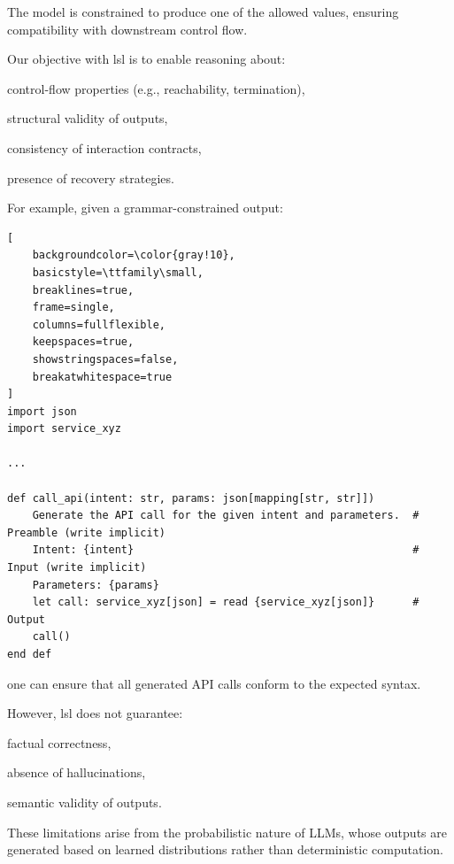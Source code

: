 \documentclass[manuscript,screen]{acmart}
\begin{document}
The model is constrained to produce one of the allowed values, ensuring compatibility with downstream control flow.


Our objective with \ac{lsl} is to enable reasoning about:
\begin{enumerate*}[label=(\roman*)]
    \item control-flow properties (e.g., reachability, termination),
    \item structural validity of outputs,
    \item consistency of interaction contracts,
    \item presence of recovery strategies.
\end{enumerate*}

For example, given a grammar-constrained output:

\begin{lstlisting}[
    backgroundcolor=\color{gray!10},
    basicstyle=\ttfamily\small,
    breaklines=true,
    frame=single,
    columns=fullflexible,
    keepspaces=true,
    showstringspaces=false,
    breakatwhitespace=true
]
import json
import service_xyz

...

def call_api(intent: str, params: json[mapping[str, str]])
    Generate the API call for the given intent and parameters.  # Preamble (write implicit)
    Intent: {intent}                                            # Input (write implicit)
    Parameters: {params}
    let call: service_xyz[json] = read {service_xyz[json]}      # Output
    call()
end def
\end{lstlisting}

one can ensure that all generated API calls conform to the expected syntax.

However, \ac{lsl} does not guarantee:
\begin{enumerate*}[label=(\roman*)]
    \item factual correctness,
    \item absence of hallucinations,
    \item semantic validity of outputs.
\end{enumerate*}

These limitations arise from the probabilistic nature of LLMs, whose outputs are generated based on learned distributions rather than deterministic computation.
\end{document}
